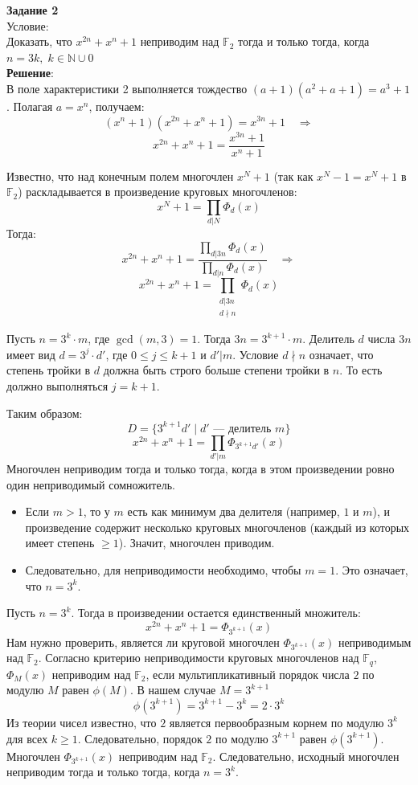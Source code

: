 \documentclass[12pt]{article}
\begin{document}
\begin{flushleft}
    \textbf{Задание 2} \\
    Условие: \\
    Доказать, что $x^{2n} + x^n + 1$ неприводим над $\mathbb{F}_2$ тогда и только тогда, когда $n = 3k, \; k \in \mathbb{N} \cup {0}$ \\
    
    \vspace{20pt}
    \textbf{Решение}: \\
    В поле характеристики 2 выполняется тождество $(a+1)(a^2+a+1) = a^3+1$. Полагая $a = x^n$, получаем:
    \[ (x^n + 1)(x^{2n} + x^n + 1) = x^{3n} + 1 \quad \Rightarrow \]
    \[ x^{2n} + x^n + 1 = \frac{x^{3n} + 1}{x^n + 1} \]
    
    Известно, что над конечным полем многочлен $x^N + 1$ (так как $x^N - 1 = x^N + 1$ в $\mathbb{F}_2$) раскладывается в произведение круговых многочленов:
    \[ x^N + 1 = \prod_{d | N} \Phi_d(x) \]
    Тогда:
    \[ x^{2n} + x^n + 1 = \frac{\prod_{d | 3n} \Phi_d(x)}{\prod_{d | n} \Phi_d(x)} \quad \Rightarrow \]
    \[ x^{2n} + x^n + 1 = \prod_{\substack{d | 3n \\ d \nmid n}} \Phi_d(x) \]

    Пусть $n = 3^k \cdot m$, где $\gcd(m, 3) = 1$. Тогда $3n = 3^{k+1} \cdot m$.
    Делитель $d$ числа $3n$ имеет вид $d = 3^j \cdot d'$, где $0 \le j \le k+1$ и $d' | m$.
    Условие $d \nmid n$ означает, что степень тройки в $d$ должна быть строго больше степени тройки в $n$. То есть должно выполняться $j = k+1$.

    Таким образом:
    \[ D = \{ 3^{k+1} d' \mid d' \text{ --- делитель } m \} \]
    \[ x^{2n} + x^n + 1 = \prod_{d' | m} \Phi_{3^{k+1} d'}(x) \]
    Многочлен неприводим тогда и только тогда, когда в этом произведении ровно один неприводимый сомножитель.
    \begin{itemize}
        \item Если $m > 1$, то у $m$ есть как минимум два делителя (например, $1$ и $m$), и произведение содержит несколько круговых многочленов (каждый из которых имеет степень $\ge 1$). Значит, многочлен приводим.
        \item Следовательно, для неприводимости необходимо, чтобы $m = 1$. Это означает, что $n = 3^k$.
    \end{itemize}

    Пусть $n = 3^k$. Тогда в произведении остается единственный множитель:
    \[ x^{2n} + x^n + 1 = \Phi_{3^{k+1}}(x) \]
    Нам нужно проверить, является ли круговой многочлен $\Phi_{3^{k+1}}(x)$ неприводимым над $\mathbb{F}_2$.
    Согласно критерию неприводимости круговых многочленов над $\mathbb{F}_q$, $\Phi_M(x)$ неприводим над $\mathbb{F}_2$, если мультипликативный порядок числа $2$ по модулю $M$ равен $\phi(M)$.
    В нашем случае $M = 3^{k+1}$
    \[ \phi(3^{k+1}) = 3^{k+1} - 3^k = 2 \cdot 3^k \]
    Из теории чисел известно, что $2$ является первообразным корнем по модулю $3^k$ для всех $k \ge 1$. Следовательно, порядок $2$ по модулю $3^{k+1}$ равен $\phi(3^{k+1})$. \\
    Многочлен $\Phi_{3^{k+1}}(x)$ неприводим над $\mathbb{F}_2$. Следовательно, исходный многочлен неприводим тогда и только тогда, когда $n = 3^k$.



\end{flushleft}
\end{document}
